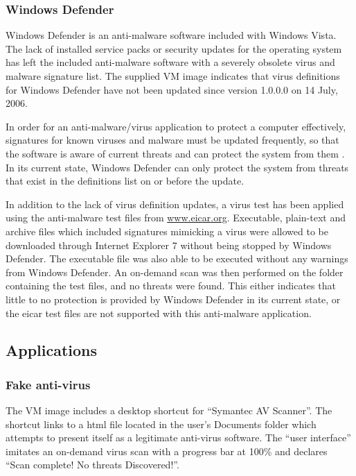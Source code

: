 \subsubsection{Windows Defender}

Windows Defender is an anti-malware software included with Windows Vista. The lack of installed service packs or security updates for the operating system has left the included anti-malware software with a severely obsolete virus and malware signature list. The supplied VM image indicates that virus definitions for Windows Defender have not been updated since version 1.0.0.0 on 14 July, 2006.

In order for an anti-malware/virus application to protect a computer effectively, signatures for known viruses and malware must be updated frequently, so that the software is aware of current threats and can protect the system from them \citep{Goodrich2011}. In its current state, Windows Defender can only protect the system from threats that exist in the definitions list on or before the update.

In addition to the lack of virus definition updates, a virus test has been applied using the anti-malware test files from \href{http://www.eicar.org/85-0-Download.html}{www.eicar.org}. Executable, plain-text and archive files which included signatures mimicking a virus were allowed to be downloaded through Internet Explorer 7 without being stopped by Windows Defender. The executable file was also able to be executed without any warnings from Windows Defender. An on-demand scan was then performed on the folder containing the test files, and no threats were found. This either indicates that little to no protection is provided by Windows Defender in its current state, or the eicar test files are not supported with this anti-malware application.

\subsection{Applications}

\subsubsection{Fake anti-virus}

The VM image includes a desktop shortcut for ``Symantec AV Scanner''. The shortcut links to a html file located in the user's Documents folder which attempts to present itself as a legitimate anti-virus software. The ``user interface'' imitates an on-demand virus scan with a progress bar at 100\% and declares ``Scan complete! No threats Discovered!''.

